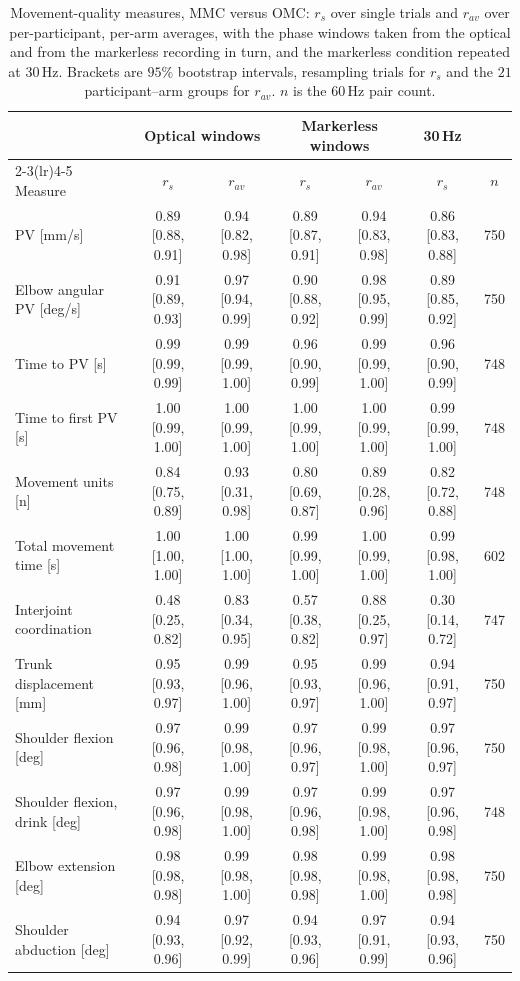 \begin{table}[t]
\caption{Movement-quality measures, MMC versus OMC: $r_s$ over single trials and
$r_{av}$ over per-participant, per-arm averages, with the phase windows taken from the
optical and from the markerless recording in turn, and the markerless condition
repeated at $30$\,Hz. Brackets are $95\%$ bootstrap intervals, resampling trials for
$r_s$ and the $21$ participant--arm groups for $r_{av}$. $n$ is the $60$\,Hz pair count.}
\label{tab:measures}
\centering
\footnotesize
\setlength{\tabcolsep}{4pt}
\begin{tabular}{lcccccc}
\toprule
 & \multicolumn{2}{c}{Optical windows} & \multicolumn{2}{c}{Markerless windows} & 30\,Hz & \\
\cmidrule(lr){2-3}\cmidrule(lr){4-5}
Measure & $r_s$ & $r_{av}$ & $r_s$ & $r_{av}$ & $r_s$ & $n$ \\
\midrule
PV [mm/s] & 0.89 [0.88, 0.91] & 0.94 [0.82, 0.98] & 0.89 [0.87, 0.91] & 0.94 [0.83, 0.98] & 0.86 [0.83, 0.88] & 750 \\
Elbow angular PV [deg/s] & 0.91 [0.89, 0.93] & 0.97 [0.94, 0.99] & 0.90 [0.88, 0.92] & 0.98 [0.95, 0.99] & 0.89 [0.85, 0.92] & 750 \\
Time to PV [s] & 0.99 [0.99, 0.99] & 0.99 [0.99, 1.00] & 0.96 [0.90, 0.99] & 0.99 [0.99, 1.00] & 0.96 [0.90, 0.99] & 748 \\
Time to first PV [s] & 1.00 [0.99, 1.00] & 1.00 [0.99, 1.00] & 1.00 [0.99, 1.00] & 1.00 [0.99, 1.00] & 0.99 [0.99, 1.00] & 748 \\
Movement units [n] & 0.84 [0.75, 0.89] & 0.93 [0.31, 0.98] & 0.80 [0.69, 0.87] & 0.89 [0.28, 0.96] & 0.82 [0.72, 0.88] & 748 \\
Total movement time [s] & 1.00 [1.00, 1.00] & 1.00 [1.00, 1.00] & 0.99 [0.99, 1.00] & 1.00 [0.99, 1.00] & 0.99 [0.98, 1.00] & 602 \\
Interjoint coordination & 0.48 [0.25, 0.82] & 0.83 [0.34, 0.95] & 0.57 [0.38, 0.82] & 0.88 [0.25, 0.97] & 0.30 [0.14, 0.72] & 747 \\
Trunk displacement [mm] & 0.95 [0.93, 0.97] & 0.99 [0.96, 1.00] & 0.95 [0.93, 0.97] & 0.99 [0.96, 1.00] & 0.94 [0.91, 0.97] & 750 \\
Shoulder flexion [deg] & 0.97 [0.96, 0.98] & 0.99 [0.98, 1.00] & 0.97 [0.96, 0.97] & 0.99 [0.98, 1.00] & 0.97 [0.96, 0.97] & 750 \\
Shoulder flexion, drink [deg] & 0.97 [0.96, 0.98] & 0.99 [0.98, 1.00] & 0.97 [0.96, 0.98] & 0.99 [0.98, 1.00] & 0.97 [0.96, 0.98] & 748 \\
Elbow extension [deg] & 0.98 [0.98, 0.98] & 0.99 [0.98, 1.00] & 0.98 [0.98, 0.98] & 0.99 [0.98, 1.00] & 0.98 [0.98, 0.98] & 750 \\
Shoulder abduction [deg] & 0.94 [0.93, 0.96] & 0.97 [0.92, 0.99] & 0.94 [0.93, 0.96] & 0.97 [0.91, 0.99] & 0.94 [0.93, 0.96] & 750 \\
\bottomrule
\end{tabular}
\end{table}
